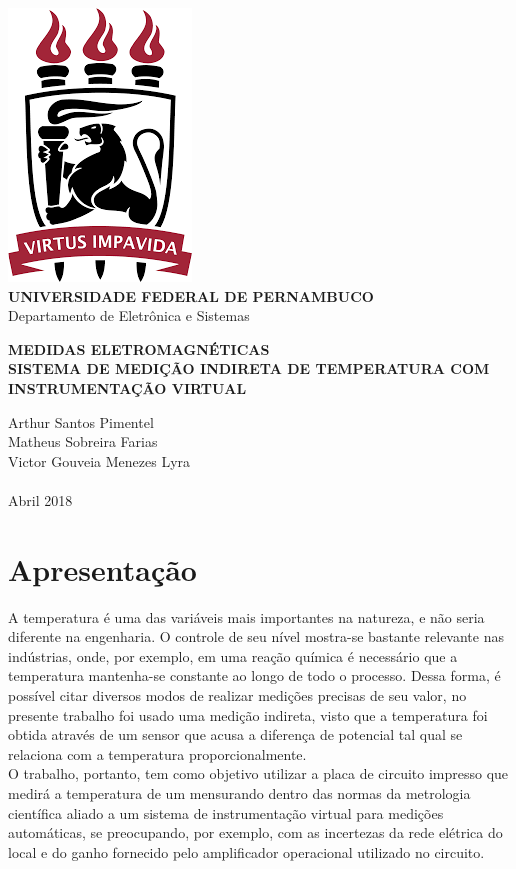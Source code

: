 \documentclass[14pt, oneside]{book}
\newcommand\tab[1][1cm]{\hspace*{#1}}
\theoremstyle{definition}
\begin{document}

    \begin{titlepage}
        \centering 
        \includegraphics[scale = 0.8]{ufpe.png} \\
        \Large{\textbf{UNIVERSIDADE FEDERAL DE PERNAMBUCO}}\\
        \large{Departamento de Eletrônica e Sistemas}
   
        \Huge\textbf{MEDIDAS ELETROMAGNÉTICAS}\\
        \Large\textbf{SISTEMA DE MEDIÇÃO INDIRETA DE TEMPERATURA COM INSTRUMENTAÇÃO VIRTUAL}
   
        \vfill
        \Large{Arthur Santos Pimentel} \\
        \Large{Matheus Sobreira Farias} \\
        \Large{Victor Gouveia Menezes Lyra}
        \\~\\
        \Large{Abril 2018}
    \end{titlepage}

    
    \mainmatter
        \chapter{Apresentação}
            \tab A temperatura é uma das variáveis mais importantes na natureza, e não seria diferente na engenharia. O controle de seu nível mostra-se bastante relevante nas indústrias, onde, por exemplo, em uma reação química é necessário que a temperatura mantenha-se constante ao longo de todo o processo. Dessa forma, é possível citar diversos modos de realizar medições precisas de seu valor, no presente trabalho foi usado uma medição indireta, visto que a temperatura foi obtida através de um sensor que acusa a diferença de potencial tal qual se relaciona com a temperatura proporcionalmente. \\
            \tab O trabalho, portanto, tem como objetivo utilizar a placa de circuito impresso que medirá a temperatura de um mensurando dentro das normas da metrologia científica aliado a um sistema de instrumentação virtual para medições automáticas, se preocupando, por exemplo, com as incertezas da rede elétrica do local e do ganho fornecido pelo amplificador operacional utilizado no circuito.
                
\end{document}
